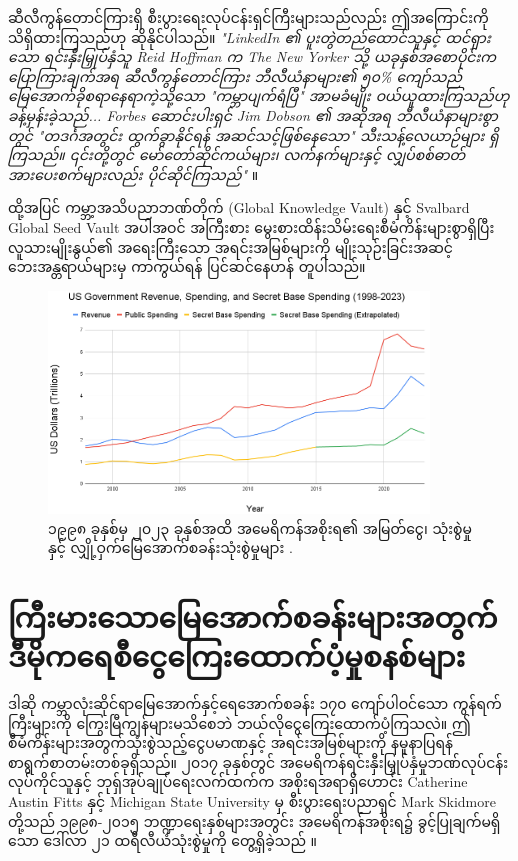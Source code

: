 \documentclass[10pt,twocolumn,letterpaper]{article}
\begin{document}
ဆီလီကွန်တောင်ကြားရှိ စီးပွားရေးလုပ်ငန်းရှင်ကြီးများသည်လည်း ဤအကြောင်းကို သိရှိထားကြသည်ဟု ဆိုနိုင်ပါသည်။ \textit{"LinkedIn ၏ ပူးတွဲတည်ထောင်သူနှင့် ထင်ရှားသော ရင်းနှီးမြှုပ်နှံသူ Reid Hoffman က The New Yorker သို့ ယခုနှစ်အစောပိုင်းက ပြောကြားချက်အရ ဆီလီကွန်တောင်ကြား ဘီလီယံနာများ၏ ၅၀\% ကျော်သည် မြေအောက်ခိုစရာနေရာကဲ့သို့သော "ကမ္ဘာပျက်ရံပြီ" အာမခံမျိုး ဝယ်ယူထားကြသည်ဟု ခန့်မှန်းခဲ့သည်... Forbes ဆောင်းပါးရှင် Jim Dobson ၏ အဆိုအရ ဘီလီယံနာများစွာတွင် "တဒင်္ဂအတွင်း ထွက်ခွာနိုင်ရန် အဆင်သင့်ဖြစ်နေသော" သီးသန့်လေယာဉ်များ ရှိကြသည်။ ၎င်းတို့တွင် မော်တော်ဆိုင်ကယ်များ၊ လက်နက်များနှင့် လျှပ်စစ်ဓာတ်အားပေးစက်များလည်း ပိုင်ဆိုင်ကြသည်"} \cite{28}။

ထို့အပြင် ကမ္ဘာ့အသိပညာဘဏ်တိုက် (Global Knowledge Vault) နှင့် Svalbard Global Seed Vault \cite{30} အပါအဝင် အကြီးစား မွေးစားထိန်းသိမ်းရေးစီမံကိန်းများစွာရှိပြီး လူသားမျိုးနွယ်၏ အရေးကြီးသော အရင်းအမြစ်များကို မျိုးသုဉ်းခြင်းအဆင့် ဘေးအန္တရာယ်များမှ ကာကွယ်ရန် ပြင်ဆင်နေဟန် တူပါသည်။
\begin{figure}[t]
\begin{center}
\includegraphics[width=0.9\textwidth]{govcrop2.png}
\end{center}
   \caption{၁၉၉၈ ခုနှစ်မှ ၂၀၂၃ ခုနှစ်အထိ အမေရိကန်အစိုးရ၏ အမြတ်ငွေ၊ သုံးစွဲမှုနှင့် လျှို့ဝှက်မြေအောက်စခန်းသုံးစွဲမှုများ \cite{19}.}
   \label{fig:9}
\end{figure}
\section{ကြီးမားသောမြေအောက်စခန်းများအတွက် ဒီမိုကရေစီငွေကြေးထောက်ပံ့မှုစနစ်များ}

ဒါဆို ကမ္ဘာလုံးဆိုင်ရာမြေအောက်နှင့်ရေအောက်စခန်း ၁၇၀ ကျော်ပါဝင်သော ကွန်ရက်ကြီးများကို ကြွေးမြီကျွန်များမသိစေဘဲ ဘယ်လိုငွေကြေးထောက်ပံ့ကြသလဲ။ ဤစီမံကိန်းများအတွက်သုံးစွဲသည့်ငွေပမာဏနှင့် အရင်းအမြစ်များကို နမူနာပြရန် စာရွက်စာတမ်းတစ်ခုရှိသည်။ ၂၀၁၇ ခုနှစ်တွင် အမေရိကန်ရင်းနှီးမြှုပ်နှံမှုဘဏ်လုပ်ငန်းလုပ်ကိုင်သူနှင့် ဘုရှ်အုပ်ချုပ်ရေးလက်ထက်က အစိုးရအရာရှိဟောင်း Catherine Austin Fitts နှင့် Michigan State University မှ စီးပွားရေးပညာရှင် Mark Skidmore တို့သည် ၁၉၉၈-၂၀၁၅ ဘဏ္ဍာရေးနှစ်များအတွင်း အမေရိကန်အစိုးရ၌ ခွင့်ပြုချက်မရှိသော ဒေါ်လာ ၂၁ ထရီလီယံသုံးစွဲမှုကို တွေ့ရှိခဲ့သည် \cite{11,12,13}။
\end{document}
